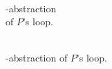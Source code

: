 \begin{minipage}[t]{0.35\linewidth} \centering
	\begin{figure}[H]
			
			\caption{\\ \qvasr-abstraction \\ of $P$'s loop.}
	\end{figure}
\end{minipage}
\begin{minipage}[t]{0.3\linewidth} \centering
	\begin{figure}[H]
		
		\caption{\\ \qvasrs-abstraction of $P$'s loop.}
	\end{figure}
\end{minipage}